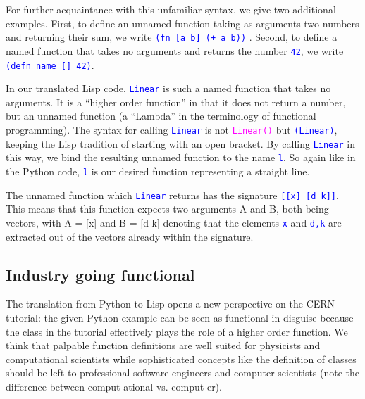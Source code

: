 \documentclass[twocolumn]{article}
\begin{document}
For further acquaintance with this unfamiliar syntax, we give two additional examples. First, to define an unnamed function taking as arguments two numbers and returning their sum, we write \texttt{\textcolor{blue}{(fn [a b] (+ a b))}} . Second, to define a named function that takes no arguments and returns the number \texttt{\textcolor{blue}{42}}, we write \texttt{\textcolor{blue}{(defn name [] 42)}}.

In our translated Lisp code, \texttt{\textcolor{blue}{Linear}} is such a named function that takes no arguments. It is a “higher order function” in that it does not return a number, but an unnamed function (a “Lambda” in the terminology of functional programming). The syntax for calling \texttt{\textcolor{blue}{Linear}} is not \texttt{\textcolor{magenta}{Linear()}} but \texttt{\textcolor{blue}{(Linear)}}, keeping the Lisp tradition of starting with an open bracket. By calling \texttt{\textcolor{blue}{Linear}} in this way, we bind the resulting unnamed function to the name \texttt{\textcolor{blue}{l}}. So again like in the Python code, \texttt{\textcolor{blue}{l}} is our desired function representing a straight line. 

The unnamed function which \texttt{\textcolor{blue}{Linear}} returns has the signature \texttt{\textcolor{blue}{[[x] [d k]]}}. This means that this function expects two arguments A and B, both being vectors, with A = [x] and B = [d k] denoting that the elements \texttt{\textcolor{blue}{x}} and \texttt{\textcolor{blue}{d,k}} are extracted out of the vectors already within the signature.

\subsection{Industry going functional}
The translation from Python to Lisp opens a new perspective on the CERN tutorial: the given Python example can be seen as functional in disguise because the class in the tutorial effectively plays the role of a higher order function. We think that palpable function definitions are well suited for physicists and computational scientists while sophisticated concepts like the definition of classes should be left to  professional software engineers and computer scientists (note the difference between comput-ational vs. comput-er).
\end{document}

